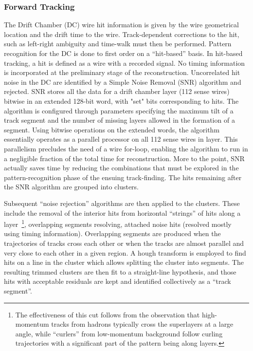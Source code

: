 \documentclass{elsart}
\begin{document}
\subsubsection{Forward Tracking}

The Drift Chamber (DC) wire hit information is given by the wire geometrical location and the drift time
to the wire. Track-dependent corrections to the hit, such as left-right ambiguity and time-walk must then
be performed. Pattern recognition for the DC is done to first order on a ``hit-based'' basis. In hit-based
tracking, a hit is defined as a wire with a recorded signal.  No timing information is incorporated at the
preliminary stage of the reconstruction.  Uncorrelated hit noise in the DC are identified by a Simple Noise
Removal (SNR) algorithm and rejected. SNR stores all the data for a drift chamber layer (112 sense wires)
bitwise in an extended 128-bit word, with "set" bits corresponding to hits. The algorithm is configured
through parameters specifying the maximum tilt of a track segment and the number of missing layers
allowed in the formation of a segment. Using bitwise operations on the extended words, the algorithm
essentially operates as a parallel processor on all 112 sense wires in layer. This parallelism precludes the
need of a wire for-loop, enabling the algorithm to run in a negligible fraction of the total time for
reconstruction. More to the point, SNR actually saves time by reducing the combinations that must be
explored in the pattern-recognition phase of the ensuing track-finding. The hits remaining after the SNR
algorithm are grouped into clusters. 

Subsequent ``noise rejection'' algorithms are then applied to the clusters. These include the removal of the
interior hits from horizontal ``strings'' of hits along a layer~\footnote{The effectiveness of this cut follows
  from the observation that high-momentum tracks from hadrons typically cross the superlayers at a large angle,
  while ``curlers'' from low-momentum background follow curling trajectories with a significant part of the
  pattern being along layers.}, overlapping segments resolving, attached noise hits (resolved mostly using timing
information). Overlapping segments are produced when the trajectories of tracks cross each other 
or when the tracks are almost parallel and very close to each other in a given region. 
A hough transform is employed to find hits on a line in the cluster which allows splitting the cluster into 
segments.  The resulting trimmed clusters are then fit to a straight-line hypothesis, and those hits with
acceptable residuals are kept and identified collectively as a ``track segment''. 
\end{document}
